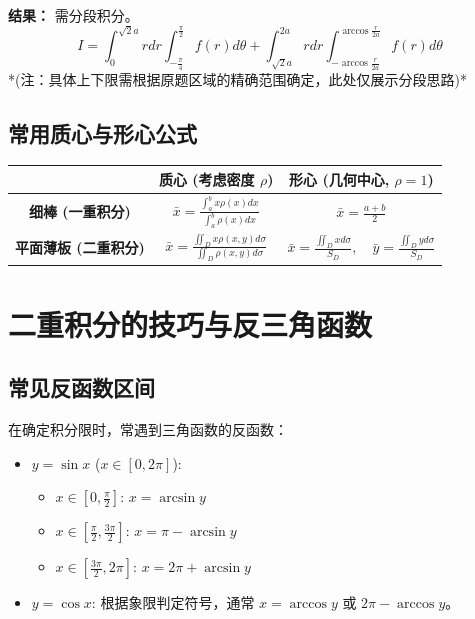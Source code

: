 \documentclass[a4paper,12pt]{ctexart}
\begin{document}
\textbf{结果：} 需分段积分。
\[ I = \int_0^{\sqrt{2}a} r dr \int_{-\frac{\pi}{4}}^{\frac{\pi}{2}} f(r) d\theta + \int_{\sqrt{2}a}^{2a} r dr \int_{-\arccos\frac{r}{2a}}^{\arccos\frac{r}{2a}} f(r) d\theta \]
*(注：具体上下限需根据原题区域的精确范围确定，此处仅展示分段思路)*

\subsection{常用质心与形心公式}

\begin{table}[H]
\centering
\renewcommand{\arraystretch}{2.0}
\begin{tabular}{|c|c|c|}
\hline
& \textbf{质心 (考虑密度 $\rho$)} & \textbf{形心 (几何中心, $\rho=1$)} \\ 
\hline
\textbf{细棒 (一重积分)} & $\bar{x} = \frac{\int_a^b x \rho(x) dx}{\int_a^b \rho(x) dx}$ & $\bar{x} = \frac{a+b}{2}$ \\ 
\hline
\textbf{平面薄板 (二重积分)} & $\bar{x} = \frac{\iint_D x \rho(x,y) d\sigma}{\iint_D \rho(x,y) d\sigma}$ & $\bar{x} = \frac{\iint_D x d\sigma}{S_D}, \quad \bar{y} = \frac{\iint_D y d\sigma}{S_D}$ \\ 
\hline
\end{tabular}
\end{table}

\section{二重积分的技巧与反三角函数}

\subsection{常见反函数区间}
在确定积分限时，常遇到三角函数的反函数：
\begin{itemize}
    \item \textbf{$y = \sin x$} ($x \in [0, 2\pi]$):
    \begin{itemize}
        \item $x \in [0, \frac{\pi}{2}]$: $x = \arcsin y$
        \item $x \in [\frac{\pi}{2}, \frac{3\pi}{2}]$: $x = \pi - \arcsin y$
        \item $x \in [\frac{3\pi}{2}, 2\pi]$: $x = 2\pi + \arcsin y$
    \end{itemize}
    \item \textbf{$y = \cos x$}: 根据象限判定符号，通常 $x = \arccos y$ 或 $2\pi - \arccos y$。
\end{itemize}
\end{document}
